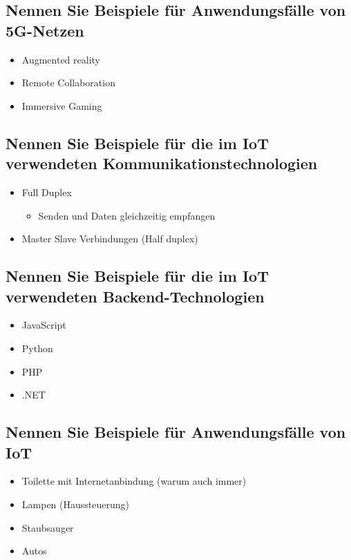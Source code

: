 \subsection*{Nennen Sie Beispiele für Anwendungsfälle von 5G-Netzen}
\begin{itemize}
    \item Augmented reality
    \item Remote Collaboration
    \item Immersive Gaming
\end{itemize}

\subsection*{Nennen Sie Beispiele für die im IoT verwendeten Kommunikationstechnologien}
\begin{itemize}
    \item Full Duplex
    \begin{itemize}
        \item Senden und Daten gleichzeitig empfangen
    \end{itemize}
    \item Master Slave Verbindungen (Half duplex)
\end{itemize}

\subsection*{Nennen Sie Beispiele für die im IoT verwendeten Backend-Technologien}
\begin{itemize}
    \item JavaScript
    \item Python
    \item PHP
    \item .NET
\end{itemize}

\subsection*{Nennen Sie Beispiele für Anwendungsfälle von IoT}
\begin{itemize}
    \item Toilette mit Internetanbindung (warum auch immer)
    \item Lampen (Haussteuerung)
    \item Staubsauger
    \item Autos
\end{itemize}
